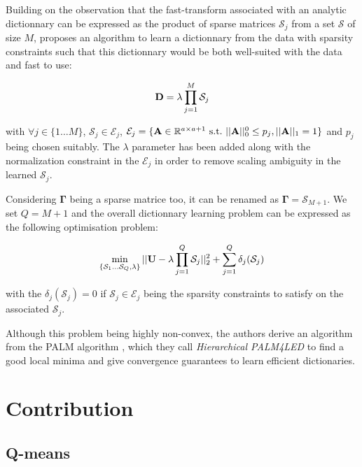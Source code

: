 \documentclass{article}
\def\rmGamma{{\mathbf{\Gamma}}}
\begin{document}
Building on the observation that the fast-transform associated with an analytic dictionnary can be expressed as the product of sparse matrices $\mathcal{S}_j$ from a set $\mathcal{S}$ of size $M$, \cite{magoarou2014learning} proposes an algorithm to learn a dictionnary from the data with sparsity constraints such that this dictionnary would be both well-suited with the data and fast to use:

\begin{equation}
{\mathbf{D}} = \lambda \prod_{j=1}^{M}\mathcal{S}_j
\end{equation}

with $\forall j \in \{1 \ldots M\}$, $\mathcal{S}_j \in \mathcal{E}_j$, $\mathcal{E}_j = \lbrace {\mathbf{A}} \in \mathbb{R}^{a \times a+1}~\text{s.t.}~||{\mathbf{A}}||_0^0 \leq p_j, ||{\mathbf{A}}||_1 = 1 \rbrace$ and $p_j$ being chosen suitably. The $\lambda$ parameter has been added along with the normalization constraint in the $\mathcal{E}_j$ in order to remove scaling ambiguity in the learned $\mathcal{S}_j$.

Considering $\rmGamma$ being a sparse matrice too, it can be renamed as $\rmGamma = \mathcal{S}_{M+1}$. We set $Q = M+1$ and the overall dictionnary learning problem can be expressed as the following optimisation problem:

\begin{equation}
\label{eq:problem_gribon}
\min_{\{\mathcal{S}_1 \dots \mathcal{S}_Q, \lambda\}} ||{\mathbf{U}} - \lambda \prod_{j=1}^{Q}{\mathcal{S}_j}||_2^2 + \sum_{j=1}^{Q} \delta_j(\mathcal{S}_j)
\end{equation}

with the $\delta_j(\mathcal{S}_j) = 0$ if $\mathcal{S}_j \in \mathcal{E}_j$ being the sparsity constraints to satisfy on the associated $\mathcal{S}_j$.

Although this problem being highly non-convex, the authors derive an algorithm from the PALM algorithm \cite{bolte2014proximal}, which they call \textit{Hierarchical PALM4LED} to find a good local minima and give convergence guarantees to learn efficient dictionaries.


\section{Contribution}

\subsection{Q-means}
\end{document}
